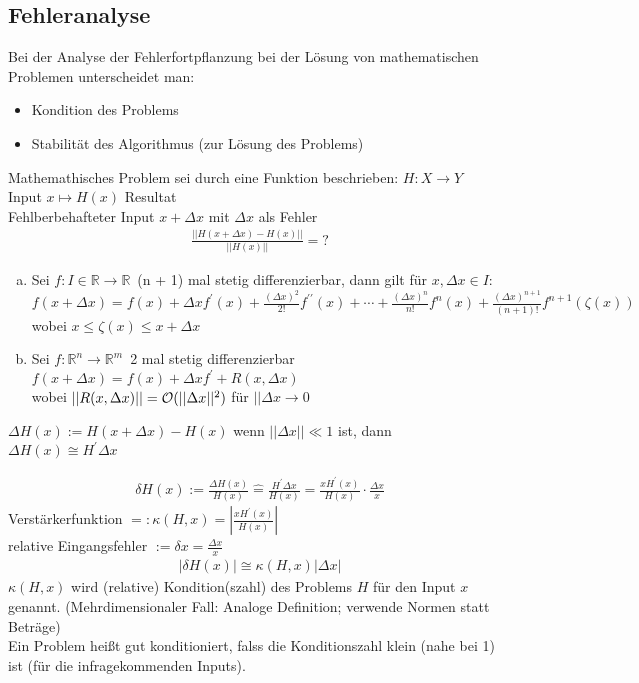 \subsection{Fehleranalyse}
Bei der Analyse der Fehlerfortpflanzung bei der Lösung von mathematischen Problemen
unterscheidet man:
\begin{itemize}
  \item Kondition des Problems
  \item Stabilität des Algorithmus (zur Lösung des Problems)
\end{itemize}
Mathemathisches Problem sei durch eine Funktion beschrieben: $H:X \to Y$ \\ Input
$x \mapsto H(x)$ Resultat\\
Fehlberbehafteter Input $x + \Delta x$ mit $\Delta x$ als Fehler
\begin{align*}
  \frac{|| H(x + \Delta x) - H(x)||}{|| H(x) ||} = ?
\end{align*}
\begin{enumerate}[(a)]
  \item Sei $f: I \in \mathbb{R} \to \mathbb{R}\,$ (n + 1) mal stetig differenzierbar, dann gilt für
    $x, \Delta x \in I$: \\
    $f(x + \Delta x) = f(x) + \Delta x f^{\prime}(x) + 
    \frac{(\Delta x)^2}{2!}f^{\prime\prime}(x) + \cdots + 
    \frac{(\Delta x)^n}{n!}f^n(x)+
    \frac{(\Delta x)^{n + 1}}{(n + 1)!}f^{n + 1}(\zeta(x)) $ \\
    wobei $x \leq \zeta(x)\leq x + \Delta x$
  \item Sei $f: \mathbb{R}^n \to \mathbb{R}^m\,$ 2 mal stetig differenzierbar \\
    $f(x + \Delta x) = f(x) + \Delta x f^{\prime} + R(x, \Delta x) $ \\
    wobei $||R(x, \Delta x)|| = \mathcal{O}(||\Delta x||^2)$ für $||\Delta x \to 0$
\end{enumerate}

$\Delta H(x) := H(x + \Delta x) - H(x)$ wenn $||\Delta x|| \ll 1$ ist, dann \\
$\Delta H(x) \cong H^{\prime} \Delta x$

\begin{align*}
  \delta H(x) := \frac{\Delta H(x)}{H(x)} \mathrel{\widehat{=}} 
  \frac{H^{\prime} \Delta x}{H(x)} =
  \frac{x H^{\prime}(x)}{H(x)} \cdot \frac{\Delta x}{x}
\end{align*}
Verstärkerfunktion $=: \kappa(H, x) = | \frac{x H^{\prime}(x)}{H(x)} |$ \\
relative Eingangsfehler $:= \delta x = \frac{\Delta x}{x}$
\begin{align*}
  |\delta H(x)|  \cong \kappa(H, x) |\Delta x|
\end{align*}
$\kappa(H, x)$ wird (relative) Kondition(szahl) des Problems $H$ für den Input $x$
genannt. (Mehrdimensionaler Fall: Analoge Definition; verwende Normen statt Beträge) \\
Ein Problem heißt gut konditioniert, falss die Konditionszahl klein (nahe bei 1) ist
(für die infragekommenden Inputs).

